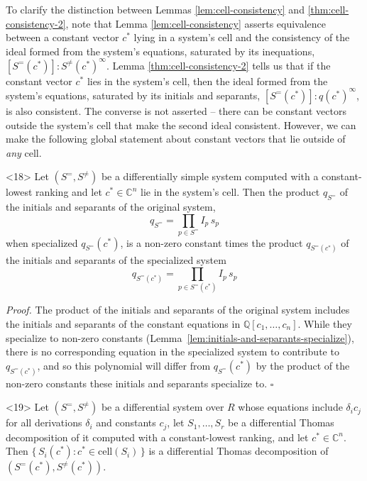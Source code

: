 \documentclass{article}
\theoremstyle{definition}
\theoremstyle{plain}
\newcommand{\qedbox}{\hspace*{\fill}\ensuremath{\square}}
\begin{document}
To clarify the distinction between Lemmas \ref{lem:cell-consistency} and \ref{thm:cell-consistency-2},
note that Lemma \ref{lem:cell-consistency} asserts equivalence between a constant vector $c^*$ lying
in a system's cell and the consistency of the ideal formed from the system's equations, saturated by its inequations,
$[S^=(c^*)]:S^{\ne}(c^*)^\infty$.
Lemma \ref{thm:cell-consistency-2} tells us that if the constant vector $c^*$ lies in the system's
cell, then the ideal formed from the system's equations, saturated by its initials and separants, $[S^=(c^*)] : q(c^*)^\infty$,
is also consistent.  The converse is not asserted -- there can be constant vectors outside the
system's cell that make the second ideal consistent.  However, we can make the following global statement
about constant vectors that lie outside of {\it any} cell.

\medskip
  \begin{lemma}<18>
  \label{lem:specialized-q}
  Let $(S^=, S^{\ne})$ be a differentially simple system computed with a
  constant-lowest ranking and let $c^* \in \mathbb{C}^n$ lie in the system's
  cell.  Then the product $q_{S^=}$ of the initials and separants of the original system,
\[
  q_{S^=} = \prod_{p \in S^=} I_p \, s_p
\]
    when specialized $q_{S^=}(c^*)$, is a non-zero constant times the product $q_{S^=(c^*)}$ of the initials and separants
    of the specialized system
\[
  q_{S^=(c^*)} = \prod_{p \in S^=(c^*)} I_p \, s_p
\]
  \end{lemma}

{\it Proof.}
  The product of the initials and separants of the original system includes
  the initials and separants of the constant equations in $\mathbb{Q}[c_1, \ldots, c_n]$.
  While they specialize to non-zero constants (Lemma~\ref{lem:initials-and-separants-specialize}),
  there is no corresponding equation
  in the specialized system to contribute to $q_{S^=(c^*)}$, and so this polynomial
  will differ from $q_{S^=}(c^*)$ by the product of the non-zero constants these initials and separants specialize to.
\qedbox

  \medskip
  \begin{lemma}<19>
  \label{lem:specialized-decomposition}
  Let $(S^=, S^{\ne})$ be a differential system over $R$ whose equations include
  $\delta_i c_j$ for all derivations $\delta_i$ and constants $c_j$,
  let $S_1, \ldots, S_r$ be a differential Thomas
  decomposition of it computed with a constant-lowest ranking, and let
  $c^* \in \mathbb{C}^n$.  Then
  $\{\, S_i(c^*) : c^* \in \mathrm{cell}(S_i) \,\}$ is a differential Thomas
  decomposition of $(S^=(c^*), S^{\ne}(c^*))$.
  \end{lemma}
\end{document}
